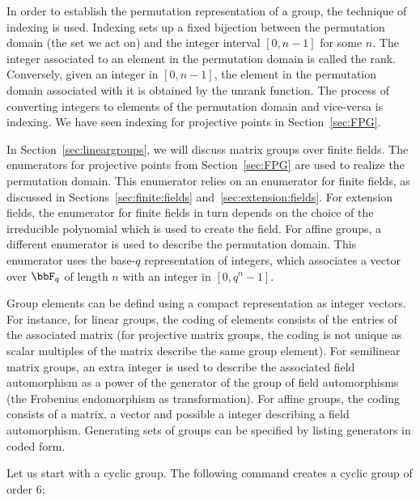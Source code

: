 \bigskip


In order to establish the permutation representation of a group, 
the technique of indexing is used. 
Indexing sets up a fixed bijection between the permutation domain (the set we act on) 
and the integer interval $[0,n-1]$ for some $n$. 
The integer associated to an element in the permutation domain is called the rank. 
Conversely, given an integer in $[0,n-1]$, the element in the permutation domain associated with it 
is obtained by the unrank function. 
The process of converting integers to elements of the permutation domain and vice-versa is indexing. 
We have seen indexing for projective points in Section~\ref{sec:FPG}. 

\bigskip


In Section~\ref{sec:lineargroups}, we will discuss 
matrix groups over finite fields. 
The enumerators for projective points from Section~\ref{sec:FPG} 
are used to realize the permutation domain. 
This enumerator relies on an enumerator for finite fields, 
as discussed in Sections~\ref{sec:finite:fields} and~\ref{sec:extension:fields}.
For extension fields, 
the enumerator for finite fields in turn depends on the choice of 
the irreducible polynomial which is used to create the field. 
For affine groups, a different enumerator is used to describe the permutation domain. 
This enumerator uses the base-$q$ representation of integers, 
which associates a vector over $\bbF_q$  of length $n$
with an integer in $[0,q^n-1].$

\bigskip


Group elements can be defind using a compact representation as integer vectors. 
For instance, for  linear groups, 
the coding of elements consists of the entries of the associated matrix (for projective matrix groups, 
the coding is not unique as scalar multiples of the matrix describe the same group element). 
For semilinear matrix groups, an extra integer is used to describe the associated field automorphism as a power of 
the generator of the group of field automorphisms (the Frobenius endomorphism as transformation).  
For affine groups, the coding consists of a matrix, a vector and possible a integer describing a field automorphism.
Generating sets of groups can be specified by listing generators in coded form.


\bigskip

Let us start with a cyclic group. 
The following command creates a cyclic group of order 6:
{\tt

}



